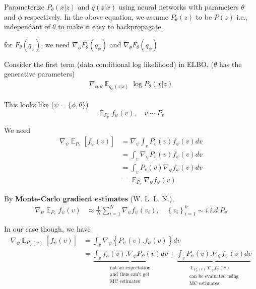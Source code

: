 \documentclass[11pt]{article}
\DeclareMathOperator*{\E}{\mathbb{E}}
\begin{document}
Parameterize $P_{\theta}(x|z)$ and $q(z|x)$ using neural networks with parameters $\theta$ and $\phi$ respectively. In the above equation, we assume $P_{\theta}(z)$ to be $P(z)$ i.e., independant of $\theta$ to make it easy to backpropagate.

\vspace{1em}

for $F_{\theta}(q_{\phi})$, we need $\nabla_{\phi}F_{\theta}(q_{\phi})$ and $\nabla_{\theta}F_{\theta}(q_{\phi})$

\vspace{1em}

Consider the first term (data conditional log likelihood) in ELBO, ($\theta$ has the generative parameters)
\begin{align*}
  \nabla_{\phi, \theta}\E_{q_{\phi}(z|x)} \log P_{\theta} (x | z)
\end{align*}

This looks like ($\psi = \{\phi, \theta\}$)
\[\E_{P_v} f_{\psi}(v), \quad v \sim P_v\]

We need
\begin{align*}
  \nabla_{\psi} \E_{P_v} \left[ f_{\psi}(v) \right] &= \nabla_{\psi} \int_v P_v(v)f_{\psi}(v)dv \\
                                                    &= \int_v\nabla_{\psi} P_v(v)f_{\psi}(v) dv \\
                                                    &= \int_v P_v(v) \nabla_{\psi} f_{\psi}(v) dv \\
                                                    &= \E_{P_v} \nabla_{\psi}f_{\psi}(v)
\end{align*}

By \textbf{Monte-Carlo gradient estimates} (W. L. L. N.),
\begin{align*}
  \nabla_{\psi}\E_{P_v} f_{\psi}(v) &\approx
                                      \frac{1}{N} \sum_{i=1}^N \nabla_{\psi}f_{\psi}(v_i), \quad \left\{ v_i \right\}^k_{i=1} \sim i.i.d. P_v
\end{align*}

In our case though, we have
\begin{align*}
  \nabla_{\psi} \E_{P_{\psi}(v)} \left[ f_{\psi}(v) \right] &= \int_v \nabla_{\psi}\left\{ P_{\psi}(v).f_{\psi}(v) \right\}dv \\
                                                            &= \underbrace{\int_v f_{\psi}(v) . \nabla_{\psi} P_{\psi}(v) dv}_{\substack{\text{not an expectation} \\ \text{and thus can't get} \\ \text{MC estimates}}}
  + \underbrace{\int_v P_{\psi}(v). \nabla_{\psi} f_{\psi}(v)dv}_{\substack{\E_{P_{\psi}(v)}\nabla_{\psi}f_{\psi}(v) \\ \text{can be evaluated using} \\ \text{MC estimates}}}
\end{align*}
\end{document}
